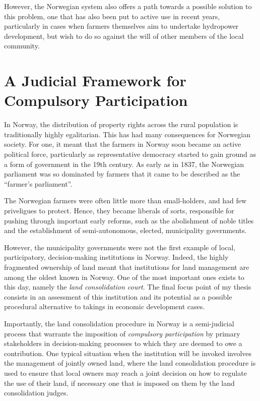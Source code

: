 However, the Norwegian system also offers a path towards a possible solution to this problem, one that has also been put to active use in recent years, particularly in cases when farmers themselves aim to undertake hydropower development, but wish to do so against the will of other members of the local community.

\section{A Judicial Framework for Compulsory Participation}

In Norway, the distribution of property rights across the rural population is traditionally highly egalitarian. This has had many consequences for Norwegian society. For one, it meant that the farmers in Norway soon became an active political force, particularly as representative democracy started to gain ground as a form of government in the 19th century. As early as in 1837, the Norwegian parliament was so dominated by farmers that it came to be described as the ``farmer's parliament''.

The Norwegian farmers were often little more than small-holders, and had few priveligues to protect. Hence, they became liberals of sorts, responsible for pushing through important early reforms, such as the abolishment of noble titles and the establishment of semi-autonomous, elected, municipality governments. 

However, the municipality governments were not the first example of local, participatory, decision-making institutions in Norway. Indeed, the highly fragmented ownership of land meant that institutions for land management are among the oldest known in Norway. One of the most important ones exists to this day, namely the {\it land consolidation court}. The final focus point of my thesis consists in an assessment of this institution and its potential as a possible procedural alternative to takings in economic development cases.

Importantly, the land consolidation procedure in Norway is a semi-judicial process that warrants the imposition of {\it compulsory participation} by primary stakeholders in decision-making processes to which they are deemed to owe a contribution. One typical situation when the institution will be invoked involves the management of jointly owned land, where the land consolidation procedure is used to ensure that local owners may reach a joint decision on how to regulate the use of their land, if necessary one that is imposed on them by the land consolidation judges.

